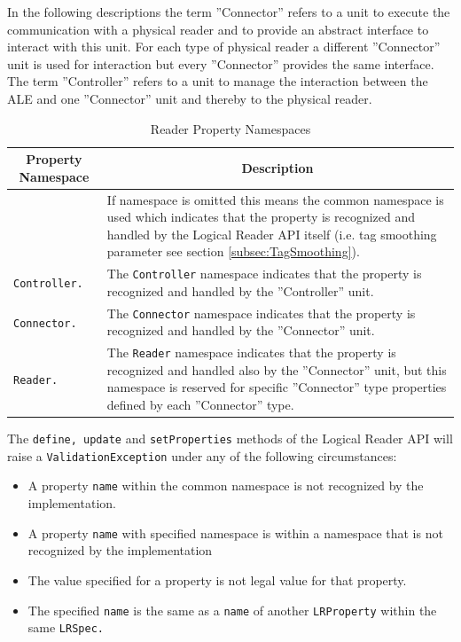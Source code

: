 \documentclass[11pt,a4paper,oneside]{article}
\begin{document}
In the following descriptions the term ''Connector'' refers to a unit to execute the communication with a physical reader and to provide an abstract interface to interact with this unit. For each type of physical reader a different ''Connector'' unit is used for interaction but every ''Connector'' provides the same interface. The term ''Controller'' refers to a unit to manage the interaction between the ALE and one ''Connector'' unit and thereby to the physical reader.

\begin{table}[!h]
\begin{tabular}{ 
|p{}%
|p{}|%
}
\hline
\multicolumn{1}{|c|}{\textbf{Property Namespace}}&
\multicolumn{1}{c|}{\textbf{Description}}\\
\hline
&If namespace is omitted this means the common namespace is used which indicates that the property is recognized and handled by the Logical Reader API itself (i.e. tag smoothing parameter see section \ref{subsec:TagSmoothing}).\\
\hline
\texttt{Controller.}&The \texttt{Controller} namespace indicates that the property is recognized and handled by the ''Controller'' unit.\\
\hline
\texttt{Connector.}&The \texttt{Connector} namespace indicates that the property is recognized and handled by the ''Connector'' unit.\\
\hline
\texttt{Reader.}&The \texttt{Reader} namespace indicates that the property is recognized and handled also by the ''Connector'' unit, but this namespace is reserved for specific ''Connector'' type properties defined by each ''Connector'' type.\\
\hline
\end{tabular}
\caption{Reader Property Namespaces}
\MakeLineNo
\end{table}
\FloatBarrier

The \texttt{define, update} and \texttt{setProperties} methods of the Logical Reader API will raise a \texttt{ValidationException} under any of the following circumstances:
\begin{itemize}
\item A property \texttt{name} within the common namespace is not recognized by the implementation.
\item A property \texttt{name} with specified namespace is within a namespace that is not recognized by the implementation
\item The value specified for a property is not legal value for that property.
\item The specified \texttt{name} is the same as a \texttt{name} of another \texttt{LRProperty} within the same \texttt{LRSpec.}
\end{itemize}
\end{document}
